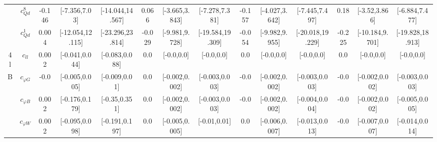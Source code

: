 \documentclass{article}
\begin{document}
\begin{table}[H]
\begin{tabular}{|c|c|c|c|c|c|c|c|c|c|c|c|c|c|}
 & $c_{Qd}^{8}$ & -0.146                             & [-7.356,7.03]                                 & [-14.044,14.567] & 0.066                             & [-3.665,3.843]                                 & [-7.278,7.381] & -0.157                             & [-4.027,3.642]                                 & [-7.445,7.497] & 0.18                             & [-3.52,3.866]                                 & [-6.884,7.477] \\ \cline{2-14}
 & $c_{Qd}^{1}$ & 0.004                             & [-12.054,12.115]                                 & [-23.296,23.814] & -0.029                             & [-9.981,9.728]                                 & [-19.584,19.309] & -0.054                             & [-9.982,9.955]                                 & [-20.018,19.229] & -0.225                             & [-10.184,9.701]                                 & [-19.828,18.913] \\ \cline{2-14}
\hline
\multirow{1}{*}{4l}
 & $c_{ll}$ & 0.002                             & [-0.041,0.044]                                 & [-0.083,0.088] & 0.0                             & [-0.0,0.0]                                 & [-0.0,0.0] & 0.0                             & [-0.0,0.0]                                 & [-0.0,0.0] & 0.0                             & [-0.0,0.0]                                 & [-0.0,0.0] \\ \cline{2-14}
\hline
\multirow{7}{*}{B}
 & $c_{\varphi G}$ & -0.0                             & [-0.005,0.005]                                 & [-0.009,0.01] & 0.0                             & [-0.002,0.002]                                 & [-0.003,0.003] & -0.0                             & [-0.002,0.002]                                 & [-0.003,0.003] & -0.0                             & [-0.002,0.002]                                 & [-0.003,0.003] \\ \cline{2-14}
 & $c_{\varphi B}$ & 0.002                             & [-0.176,0.179]                                 & [-0.35,0.351] & 0.0                             & [-0.002,0.002]                                 & [-0.003,0.003] & -0.0                             & [-0.002,0.002]                                 & [-0.004,0.004] & -0.0                             & [-0.002,0.002]                                 & [-0.005,0.005] \\ \cline{2-14}
 & $c_{\varphi W}$ & 0.002                             & [-0.095,0.098]                                 & [-0.191,0.197] & 0.0                             & [-0.005,0.005]                                 & [-0.01,0.01] & 0.0                             & [-0.006,0.007]                                 & [-0.013,0.013] & -0.0                             & [-0.007,0.007]                                 & [-0.014,0.014] \\ \cline{2-14}

\end{tabular}
\end{table}
\end{document}
